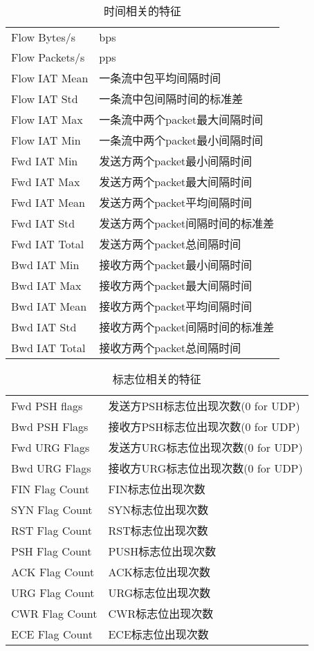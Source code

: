 \begin{table}[H]
    \caption{时间相关的特征}
    \centering
    \begin{tabular}{|l|l|}
    \hline
    Flow Bytes/s		&	bps \\
    Flow Packets/s		&	pps  \\
    Flow IAT Mean		&	一条流中包平均间隔时间 \\
    Flow IAT Std		&	一条流中包间隔时间的标准差 \\
    Flow IAT Max		&	一条流中两个packet最大间隔时间 \\
    Flow IAT Min		&	一条流中两个packet最小间隔时间 \\
    Fwd IAT Min			&发送方两个packet最小间隔时间\\
    Fwd IAT Max			&发送方两个packet最大间隔时间 \\
    Fwd IAT Mean		&	发送方两个packet平均间隔时间 \\
    Fwd IAT Std			&发送方两个packet间隔时间的标准差 \\
    Fwd IAT Total   	&	发送方两个packet总间隔时间\\
    Bwd IAT Min			&接收方两个packet最小间隔时间\\
    Bwd IAT Max			&接收方两个packet最大间隔时间\\
    Bwd IAT Mean		&	接收方两个packet平均间隔时间 \\
    Bwd IAT Std			&接收方两个packet间隔时间的标准差 \\
    Bwd IAT Total		&	接收方两个packet总间隔时间 \\  
    \hline
    \end{tabular}
    \end{table}
\begin{table}
    \caption{标志位相关的特征}
    \centering
    \begin{tabular}{|l|l|}
    \hline
    Fwd PSH flags		&	发送方PSH标志位出现次数(0 for UDP) \\
    Bwd PSH Flags		&	接收方PSH标志位出现次数(0 for UDP)\\
    Fwd URG Flags		&	发送方URG标志位出现次数(0 for UDP) \\
    Bwd URG Flags		&	接收方URG标志位出现次数(0 for UDP) \\
    FIN Flag Count 		&	FIN标志位出现次数 \\
    SYN Flag Count 		&	SYN标志位出现次数 \\
    RST Flag Count 		&	RST标志位出现次数 \\
    PSH Flag Count 		&	PUSH标志位出现次数 \\
    ACK Flag Count 		&	ACK标志位出现次数 \\
    URG Flag Count 		&	URG标志位出现次数 \\
    CWR Flag Count 		&	CWR标志位出现次数 \\
    ECE Flag Count 		&	ECE标志位出现次数 \\
    \hline
    \end{tabular}
\end{table}
    
